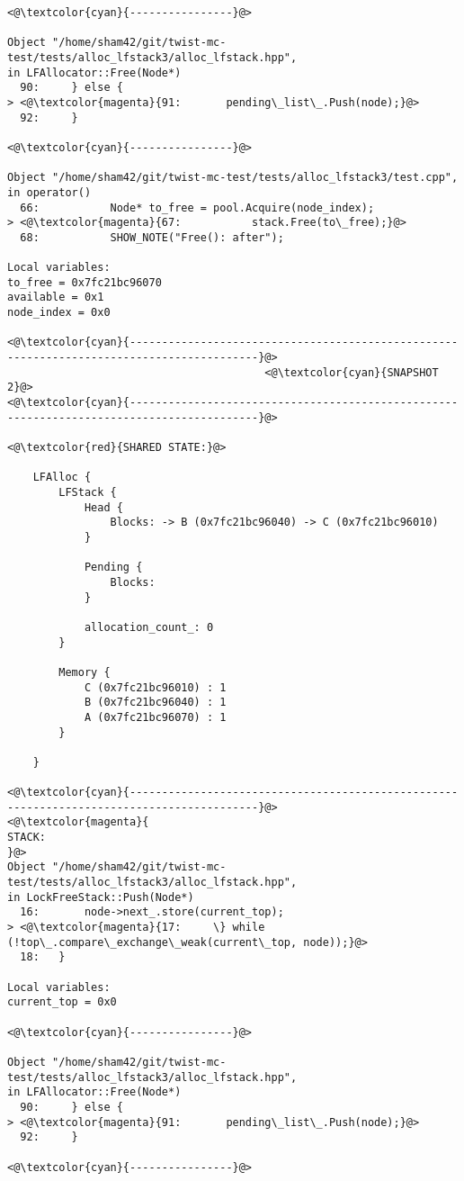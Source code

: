 \begin{adjustwidth}{-3.3cm}{-1cm}
\begin{allintypewriter}
\begin{multicols*}{2}
\begin{lstlisting}[numbers=none]
<@\textcolor{cyan}{----------------}@>

Object "/home/sham42/git/twist-mc-test/tests/alloc_lfstack3/alloc_lfstack.hpp",
in LFAllocator::Free(Node*)
  90:     } else {
> <@\textcolor{magenta}{91:       pending\_list\_.Push(node);}@>
  92:     }

<@\textcolor{cyan}{----------------}@>

Object "/home/sham42/git/twist-mc-test/tests/alloc_lfstack3/test.cpp",
in operator()
  66:           Node* to_free = pool.Acquire(node_index);
> <@\textcolor{magenta}{67:           stack.Free(to\_free);}@>
  68:           SHOW_NOTE("Free(): after");

Local variables: 
to_free = 0x7fc21bc96070
available = 0x1
node_index = 0x0

<@\textcolor{cyan}{------------------------------------------------------------------------------------------}@>
                                        <@\textcolor{cyan}{SNAPSHOT 2}@>
<@\textcolor{cyan}{------------------------------------------------------------------------------------------}@>

<@\textcolor{red}{SHARED STATE:}@>

    LFAlloc {
	    LFStack {
		    Head {
			    Blocks: -> B (0x7fc21bc96040) -> C (0x7fc21bc96010) 
		    }

		    Pending {
			    Blocks: 
		    }

		    allocation_count_: 0
	    }

	    Memory {
		    C (0x7fc21bc96010) : 1
		    B (0x7fc21bc96040) : 1
		    A (0x7fc21bc96070) : 1
	    }

    }

<@\textcolor{cyan}{------------------------------------------------------------------------------------------}@>
<@\textcolor{magenta}{
STACK:
}@>
Object "/home/sham42/git/twist-mc-test/tests/alloc_lfstack3/alloc_lfstack.hpp",
in LockFreeStack::Push(Node*)
  16:       node->next_.store(current_top);
> <@\textcolor{magenta}{17:     \} while (!top\_.compare\_exchange\_weak(current\_top, node));}@>
  18:   }

Local variables: 
current_top = 0x0

<@\textcolor{cyan}{----------------}@>

Object "/home/sham42/git/twist-mc-test/tests/alloc_lfstack3/alloc_lfstack.hpp",
in LFAllocator::Free(Node*)
  90:     } else {
> <@\textcolor{magenta}{91:       pending\_list\_.Push(node);}@>
  92:     }

<@\textcolor{cyan}{----------------}@>


\end{lstlisting}
\end{multicols*}
\end{allintypewriter}
\end{adjustwidth}
